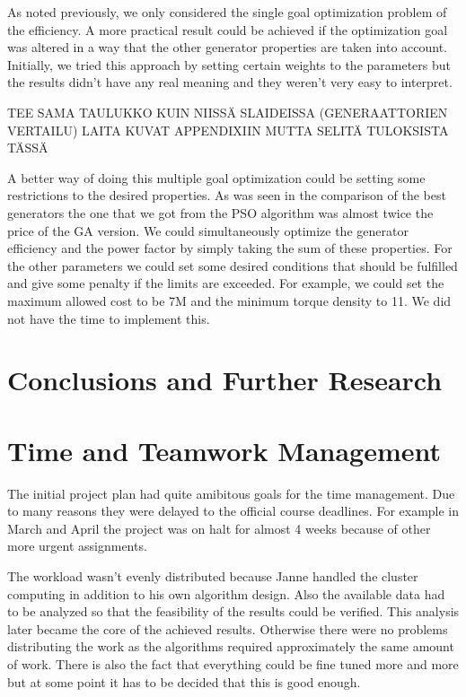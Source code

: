 \documentclass[twoside]{article}
\begin{document}
\begin{multicols}{2}
As noted previously, we only considered the single goal optimization problem of the efficiency. A more practical result could be achieved if the optimization goal was altered in a way that the other generator properties are taken into account. Initially, we tried this approach by setting certain weights to the parameters but the results didn't have any real meaning and they weren't very easy to interpret. 

TEE SAMA TAULUKKO KUIN NIISSÄ SLAIDEISSA (GENERAATTORIEN VERTAILU)
LAITA KUVAT APPENDIXIIN MUTTA SELITÄ TULOKSISTA TÄSSÄ

A better way of doing this multiple goal optimization could be setting some restrictions to the desired properties. As was seen in the comparison of the best generators the one that we got from the PSO algorithm was almost twice the price of the GA version. We could simultaneously optimize the generator efficiency and the power factor by simply taking the sum of these properties. For the other parameters we could set some desired conditions that should be fulfilled and give some penalty if the limits are exceeded. For example, we could set the maximum allowed cost to be 7M and the minimum torque density to 11. We did not have the time to implement this.


\section{Conclusions and Further Research}



\section{Time and Teamwork Management}
The initial project plan had quite amibitous goals for the time management. Due to many reasons they were delayed to the official course deadlines. For example in March and April the project was on halt for almost 4 weeks because of other more urgent assignments.

The workload wasn't evenly distributed because Janne handled the cluster computing in addition to his own algorithm design. Also the available data had to be analyzed so that the feasibility of the results could be verified. This analysis later became the core of the achieved results. Otherwise there were no problems distributing the work as the algorithms required approximately the same amount of work. There is also the fact that everything could be fine tuned more and more but at some point it has to be decided that this is good enough.


\end{multicols}
\end{document}
